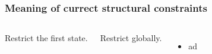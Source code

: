 \documentclass[xcolor=dvipsnames,12pt]{beamer}
\begin{document}
  \begin{frame}[fragile]
    \frametitle{Meaning of currect structural constraints}
    \begin{columns}[c]
      \column{2in}
      Restrict the first state.

    \column{2in}
    Restrict globally.
    \begin{itemize}
      \item{ad}
      \end{itemize}
    \end{columns}    
\end{frame}

\end{document}
